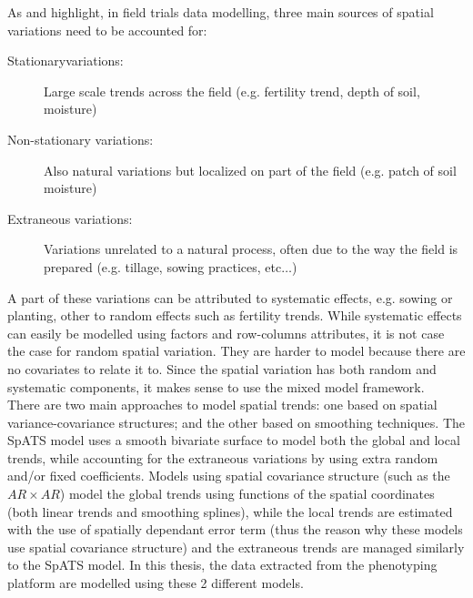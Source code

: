 As \textcite{wilkinson_nearest_1983} and \textcite{gilmour_accounting_1997} highlight, in field trials data modelling, three main sources of spatial variations need to be accounted for:
\begin{description}
    \item[Stationary\footnotemark variations:] Large scale trends across the field (e.g. fertility trend, depth of soil, moisture)
    \item[Non-stationary variations:] Also natural variations but localized on part of the field (e.g. patch of soil moisture)
    \item[Extraneous variations:] Variations unrelated to a natural process, often due to the way the field is prepared (e.g. 
    tillage, sowing practices, etc$\ldots$)
\end{description}
A part of these variations can be attributed to systematic effects, e.g. sowing or planting, other to random effects such as fertility trends. While systematic effects can easily be modelled using factors and row-columns attributes, it is not case the case for random spatial variation. They are harder to model because there are no covariates to relate it to. Since the spatial variation has both random and systematic components, it makes sense to use the mixed model framework.\\
There are two main approaches to model spatial trends: one based on spatial variance-covariance structures; and the other based on smoothing techniques. The SpATS model uses a smooth bivariate surface to model both the global and local trends, while accounting for the extraneous variations by using extra random and/or fixed coefficients. Models using spatial covariance structure (such as the $AR\times AR$) model the global trends using functions of the spatial coordinates (both linear trends and smoothing splines), while the local trends are estimated with the use of spatially dependant error term (thus the reason why these models use spatial covariance structure) and the extraneous trends are managed similarly to the SpATS model. In this thesis, the data extracted from the phenotyping platform are modelled using these 2 different models.

